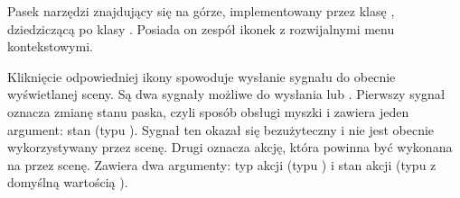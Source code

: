 \label{sec:sokar-dicomtoolbar}
\par
Pasek narzędzi znajdujący się na górze, implementowany przez klasę , dziedziczącą po klasy .
Posiada on zespół ikonek z rozwijalnymi menu kontekstowymi.

\par
Kliknięcie odpowiedniej ikony spowoduje wysłanie sygnału do obecnie wyświetlanej sceny.
Są dwa sygnały możliwe do wysłania  lub .
Pierwszy sygnał oznacza zmianę stanu paska, czyli sposób obsługi myszki i zawiera jeden argument: stan (typu ).
Sygnał ten okazał się bezużyteczny i nie jest obecnie wykorzystywany przez scenę.
Drugi oznacza akcję, która powinna być wykonana na przez scenę.
Zawiera dwa argumenty: typ akcji (typu ) i stan akcji (typu  z domyślną wartością ).

